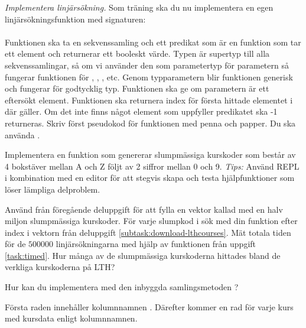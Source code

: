 \Subtask \emph{Implementera linjärsökning.} Som träning ska du nu implementera en egen linjärsökningsfunktion med signaturen: \\ 
\\ Funktionen ska ta en sekvenssamling  och ett predikat  som är en funktion som tar ett element och returnerar ett booleskt värde. Typen  är supertyp till alla sekvenssamlingar, så om vi använder den som parametertyp för parametern  så fungerar funktionen för , , , etc. Genom typparametern  blir funktionen generisk och fungerar för godtycklig typ.
Funktionen  ska ge  om parametern är ett eftersökt element. Funktionen  ska returnera index för första hittade elementet i  där  gäller. Om det inte finns något element som uppfyller predikatet ska -1 returneras. Skriv först pseudokod för funktionen med penna och papper. Du ska använda .



\Subtask \label{subtask:linsearch-rndCode} Implementera en funktion  som genererar slumpmässiga kurskoder som består av 4 bokstäver mellan A och Z följt av 2 siffror mellan 0 och 9. \emph{Tips:} Använd REPL i kombination med en editor för att stegvis skapa och testa hjälpfunktioner som löser lämpliga delproblem.


\Subtask Använd  från föregående deluppgift för att fylla en vektor kallad  med en halv miljon slumpmässiga kurskoder. För varje slumpkod i  sök med din funktion  efter index i vektorn  från deluppgift \ref{subtask:download-lthcourses}. Mät totala tiden för de $500000$ linjärsökningarna med hjälp av funktionen  från uppgift \ref{task:timed}. Hur många av de slumpmässiga kurskoderna hittades bland de verkliga kurskoderna på LTH?



\Subtask Hur kan du implementera  med den inbyggda samlingsmetoden ?



\SOLUTION


\TaskSolved \what


\SubtaskSolved
Första raden innehåller kolumnnamnen . Därefter kommer en rad för varje kurs med kursdata enligt kolumnnamnen.

